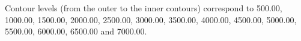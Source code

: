 Contour levels (from the outer to the inner contours) correspond to 500.00, 1000.00, 1500.00, 2000.00, 2500.00, 3000.00, 3500.00, 4000.00, 4500.00, 5000.00, 5500.00, 6000.00, 6500.00 and 7000.00.
